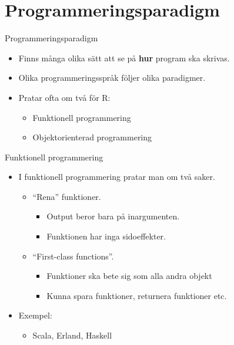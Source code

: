 \documentclass[
  11pt,
  ignorenonframetext,
  handout]{beamer}
\providecommand{\tightlist}{%
  \setlength{\itemsep}{0pt}\setlength{\parskip}{0pt}}
\newcommand\imp[1]{\alert{\textbf{#1}}}
\begin{document}
\section{Programmeringsparadigm}\label{programmeringsparadigm}

\begin{frame}{Programmeringsparadigm}
\label{programmeringsparadigm-1}
\begin{itemize}
\item
  Finns många olika sätt att se på \imp{hur} program ska skrivas.
\item
  Olika programmeringsspråk följer olika paradigmer.
\item
  Pratar ofta om två för R:

  \begin{itemize}
  \tightlist
  \item
    Funktionell programmering
  \item
    Objektorienterad programmering
  \end{itemize}
\end{itemize}
\end{frame}

\begin{frame}{Funktionell programmering}
\label{funktionell-programmering}
\begin{itemize}
\tightlist
\item
  I funktionell programmering pratar man om två saker.

  \begin{itemize}
  \tightlist
  \item
    ``Rena'' funktioner.

    \begin{itemize}
    \tightlist
    \item
      Output beror bara på inargumenten.
    \item
      Funktionen har inga sidoeffekter.
    \end{itemize}
  \item
    ``First-class functions''.

    \begin{itemize}
    \tightlist
    \item
      Funktioner ska bete sig som alla andra objekt
    \item
      Kunna spara funktioner, returnera funktioner etc.
    \end{itemize}
  \end{itemize}
\item
  Exempel:

  \begin{itemize}
  \tightlist
  \item
    Scala, Erland, Haskell
  \end{itemize}
\end{itemize}
\end{frame}
\end{document}
